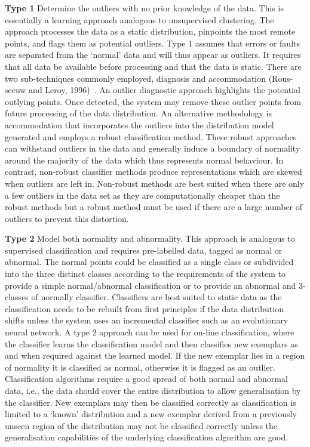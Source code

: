 \textbf{Type 1} Determine the outliers with no prior knowledge of the data. This is essentially a learning approach analogous to unsupervised clustering. The approach processes the data as a static distribution, pinpoints the most remote points, and flags them as potential outliers. Type 1 assumes that errors or faults are separated from the ‘normal’ data and will thus appear as outliers. It requires that all data be available before processing and that the data is static. There are two sub-techniques commonly employed, diagnosis and accommodation (Rous- seeuw and Leroy, 1996)~\cite{ref_d1}. An outlier diagnostic approach highlights the potential outlying points. Once detected, the system may remove these outlier points from future processing of the data distribution. An alternative methodology is accommodation that incorporates the outliers into the distribution model generated and employs a robust classification method. These robust approaches can withstand outliers in the data and generally induce a boundary of normality around the majority of the data which thus represents normal behaviour. In contrast, non-robust classifier methods produce representations which are skewed when outliers are left in. Non-robust methods are best suited when there are only a few outliers in the data set as they are computationally cheaper than the robust methods but a robust method must be used if there are a large number of outliers to prevent this distortion. 

\textbf{Type 2} Model both normality and abnormality. This approach is analogous to supervised classification and requires pre-labelled data, tagged as normal or abnormal. The normal points could be classified as a single class or subdivided into the three distinct classes according to the requirements of the system to provide a simple normal/abnormal classification or to provide an abnormal and 3-classes of normally classifier.
Classifiers are best suited to static data as the classification needs to be rebuilt from first principles if the data distribution shifts unless the system uses an incremental classifier such as an evolutionary neural network. A type 2 approach can be used for on-line classification, where the classifier learns the classification model and then classifies new exemplars as and when required against the learned model. If the new exemplar lies in a region of normality it is classified as normal, otherwise it is flagged as an outlier. Classification algorithms require a good spread of both normal and abnormal data, i.e., the data should cover the entire distribution to allow generalisation by the classifier. New exemplars may then be classified correctly as classification is limited to a ‘known’ distribution and a new exemplar derived from a previously unseen region of the distribution may not be classified correctly unless the generalisation capabilities of the underlying classification algorithm are good.

